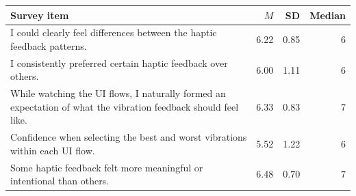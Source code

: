 \begin{appendixtable}
\centering
\small
\caption{Follow-up survey Likert summary.}
\label{tab:survey-likert-summary}
\begin{singlespace}
\renewcommand{\arraystretch}{1.1}
\begin{tabular}{@{}>{\raggedright\arraybackslash}p{3.45in}rrr@{}}
\hline
\textbf{Survey item} & \textbf{$M$} & \textbf{SD} & \textbf{Median} \\
\hline
I could clearly feel differences between the haptic feedback patterns. & 6.22 & 0.85 & 6 \\
I consistently preferred certain haptic feedback over others. & 6.00 & 1.11 & 6 \\
While watching the UI flows, I naturally formed an expectation of what the vibration feedback should feel like. & 6.33 & 0.83 & 7 \\
Confidence when selecting the best and worst vibrations within each UI flow. & 5.52 & 1.22 & 6 \\
Some haptic feedback felt more meaningful or intentional than others. & 6.48 & 0.70 & 7 \\
\hline
\end{tabular}
\end{singlespace}
\end{appendixtable}
